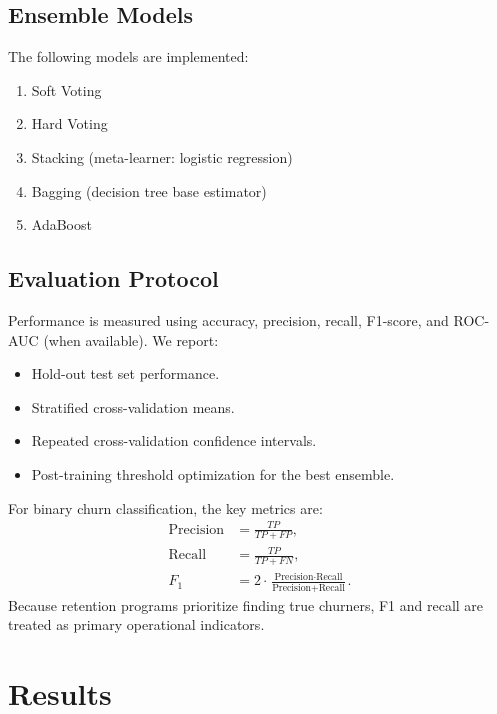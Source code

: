 \documentclass[conference]{IEEEtran}
\begin{document}
\subsection{Ensemble Models}
The following models are implemented:
\begin{enumerate}
\item Soft Voting
\item Hard Voting
\item Stacking (meta-learner: logistic regression)
\item Bagging (decision tree base estimator)
\item AdaBoost
\end{enumerate}

\subsection{Evaluation Protocol}
Performance is measured using accuracy, precision, recall, F1-score, and ROC-AUC (when available). We report:
\begin{itemize}
\item Hold-out test set performance.
\item Stratified cross-validation means.
\item Repeated cross-validation confidence intervals.
\item Post-training threshold optimization for the best ensemble.
\end{itemize}

For binary churn classification, the key metrics are:
\begin{align}
\text{Precision} &= \frac{TP}{TP+FP}, \\
\text{Recall} &= \frac{TP}{TP+FN}, \\
F_1 &= 2 \cdot \frac{\text{Precision} \cdot \text{Recall}}{\text{Precision}+\text{Recall}}.
\end{align}
Because retention programs prioritize finding true churners, F1 and recall are treated as primary operational indicators.

\section{Results}
\end{document}
